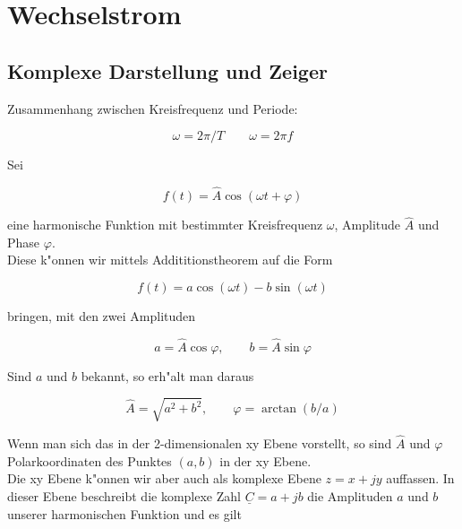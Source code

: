 \documentclass[german, 10pt, a4paper, headsepline]{scrreprt}
\theoremstyle{remark}
\begin{document}
\chapter{Wechselstrom}

\section{Komplexe Darstellung und Zeiger}

Zusammenhang zwischen Kreisfrequenz und Periode:

\begin{displaymath}
	\omega = 2\pi / T \qquad \omega = 2\pi f
\end{displaymath}

Sei

\begin{displaymath}
	f(t) = \hat{A}\cos(\omega t +\varphi)
\end{displaymath}

eine harmonische Funktion mit bestimmter Kreisfrequenz $\omega$, Amplitude  $\hat{A}$ und Phase  $\varphi$.\\

Diese k"onnen wir mittels Addititionstheorem auf die Form

\begin{displaymath}
	f(t) = a\cos(\omega t) - b\sin(\omega t)
\end{displaymath}

bringen, mit den zwei Amplituden

\begin{displaymath}
	a=\hat{A}\cos\varphi,\qquad b=\hat{A}\sin\varphi
\end{displaymath}

Sind $a$ und $b$ bekannt, so erh"alt man daraus

\begin{displaymath}
	\hat{A} = \sqrt{a^2+b^2},\qquad \varphi = \arctan(b/a)
\end{displaymath}

Wenn man sich das in der 2-dimensionalen xy Ebene vorstellt, so sind $\hat{A}$ und $\varphi$ Polarkoordinaten des Punktes $(a,b)$ in der xy Ebene.\\

Die xy Ebene k"onnen wir aber auch als komplexe Ebene $z=x+jy$ auffassen. In dieser Ebene beschreibt die komplexe Zahl $\underline{C}=a+jb$ die Amplituden $a$ und $b$ unserer harmonischen Funktion und es gilt
\end{document}
